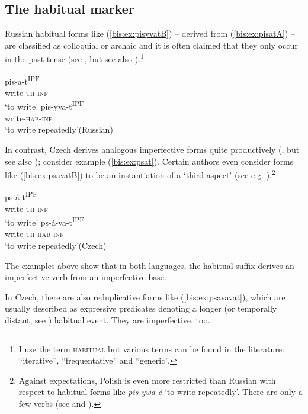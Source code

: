 \documentclass[output=paper]{langscibook}
\begin{document}
\subsection{The habitual marker}\label{bis:sec:hab}

Russian habitual forms like (\ref{bis:ex:pisyvatB}) – derived from (\ref{bis:ex:pisatA}) – are classified as colloquial or archaic and it is often claimed that they only occur in the past tense (see \citealt{Isacenko1962,Zaliznjak.Smelev1997,Paducheva2015}, but see also \citealt{Tatevosov2013}).\footnote{I use the term \textsc{habitual} but various terms can be found in the literature: ``iterative'', ``frequentative'' and ``generic''.}

\ea\label{bis:ex:pisat}
\ea\label{bis:ex:pisatA} \gll 
pis-a-ť\textsuperscript{IPF} \\ 
write-\textsc{th}-\textsc{inf} \\
\glt ‘to write’
\ex\label{bis:ex:pisyvatB} \gll pis-yva-ť\textsuperscript{IPF} \\ 
write-\textsc{hab}-\textsc{inf} \\
\glt ‘to write repeatedly’\hfill (Russian)
\z
\z

\noindent In contrast, Czech derives analogous imperfective forms quite productively (\citealt{Filip1993,Filip.Carlson1997,Esvan2007,Nubler2017}, but see also \citealt{Berger2009}); consider example (\ref{bis:ex:psat}). Certain authors even consider forms like (\ref{bis:ex:psavatB}) to be an instantiation of a ‘third aspect’ (see e.g. \citealt{Kopecny1962}).\footnote{Against expectations, Polish is even more restricted than Russian with respect to habitual forms like \textit{pis-ywa-ć} ‘to write repeatedly’. There are only a few verbs (see \citealt{Grzegorczykowa.etal1984} and \citealt{Lazinski2020}).}

\ea\label{bis:ex:psat}
\ea\label{bis:ex:psatA} \gll 
ps-á-t\textsuperscript{IPF} \\ 
write-\textsc{th}-\textsc{inf} \\
\glt ‘to write’
\ex\label{bis:ex:psavatB} \gll ps-á-va-t\textsuperscript{IPF} \\ 
write-\textsc{th}-\textsc{hab}-\textsc{inf} \\
\glt ‘to write repeatedly’\hfill (Czech)
\z
\z

\noindent The examples above show that in both languages, the habitual suffix derives an imperfective verb from an imperfective base.

In Czech, there are also reduplicative forms like (\ref{bis:ex:psavavat}), which are usually described as expressive predicates denoting a longer (or temporally distant, see \citealt{Filip1993}) habitual event. They are imperfective, too.
\end{document}
